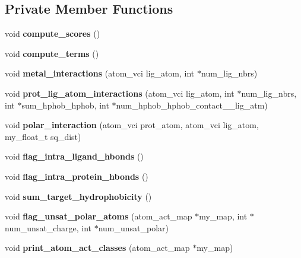 \subsection*{Private Member Functions}
\begin{CompactItemize}
\item 
void \textbf{compute\_\-scores} ()\label{classSimSite3D_1_1ProtLigScore_020f3f7d5ed48200fee48009a7bd0981}

\item 
void \textbf{compute\_\-terms} ()\label{classSimSite3D_1_1ProtLigScore_3273df40e4af4de8771f42a171ff49b9}

\item 
void \textbf{metal\_\-interactions} (atom\_\-vci lig\_\-atom, int $\ast$num\_\-lig\_\-nbrs)\label{classSimSite3D_1_1ProtLigScore_43197dcbdb8db5e8134c4536593a1554}

\item 
void \textbf{prot\_\-lig\_\-atom\_\-interactions} (atom\_\-vci lig\_\-atom, int $\ast$num\_\-lig\_\-nbrs, int $\ast$sum\_\-hphob\_\-hphob, int $\ast$num\_\-hphob\_\-hphob\_\-contact\_\_\-lig\_\-atm)\label{classSimSite3D_1_1ProtLigScore_35a77eb830e6ea30f0f7e0974337e507}

\item 
void \textbf{polar\_\-interaction} (atom\_\-vci prot\_\-atom, atom\_\-vci lig\_\-atom, my\_\-float\_\-t sq\_\-dist)\label{classSimSite3D_1_1ProtLigScore_f0ffc28a9f7912538c6a50ddbd892af3}

\item 
void \textbf{flag\_\-intra\_\-ligand\_\-hbonds} ()\label{classSimSite3D_1_1ProtLigScore_52feb68979289cc9695aaf867c54694e}

\item 
void \textbf{flag\_\-intra\_\-protein\_\-hbonds} ()\label{classSimSite3D_1_1ProtLigScore_9bf29dd817db457447811f73f49e3dff}

\item 
void \textbf{sum\_\-target\_\-hydrophobicity} ()\label{classSimSite3D_1_1ProtLigScore_15510c6a4dd67ed6855d344a4ea26806}

\item 
void \textbf{flag\_\-unsat\_\-polar\_\-atoms} (atom\_\-act\_\-map $\ast$my\_\-map, int $\ast$num\_\-unsat\_\-charge, int $\ast$num\_\-unsat\_\-polar)\label{classSimSite3D_1_1ProtLigScore_d98d4a8ed3743a00db0f83efe90d0f1e}

\item 
void \textbf{print\_\-atom\_\-act\_\-classes} (atom\_\-act\_\-map $\ast$my\_\-map)\label{classSimSite3D_1_1ProtLigScore_b56c70e1c49a08b5b8bd3b52b508b43d}

\end{CompactItemize}
